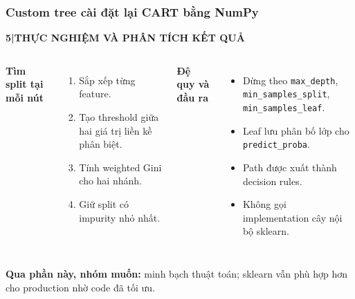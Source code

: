 \documentclass[aspectratio=169,12pt]{beamer}
\newcommand{\chaptertag}[2]{%
  \vspace{-0.16cm}%
  {\scriptsize\bfseries\textcolor{boxframe}{#1\enspace |\enspace #2}}\par
  \vspace{0.12cm}%
}
\begin{document}
\begin{frame}
  \frametitle{Custom tree cài đặt lại CART bằng NumPy}
  \chaptertag{5}{THỰC NGHIỆM VÀ PHÂN TÍCH KẾT QUẢ}
  \footnotesize
  \begin{columns}[T,onlytextwidth]
      \textbf{Tìm split tại mỗi nút}
      \begin{enumerate}
        \item Sắp xếp từng feature.
        \item Tạo threshold giữa hai giá trị liền kề phân biệt.
        \item Tính weighted Gini cho hai nhánh.
        \item Giữ split có impurity nhỏ nhất.
      \end{enumerate}
      \textbf{Đệ quy và đầu ra}
      \begin{itemize}
        \item Dừng theo \texttt{max\_depth}, \texttt{min\_samples\_split}, \texttt{min\_samples\_leaf}.
        \item Leaf lưu phân bố lớp cho \texttt{predict\_proba}.
        \item Path được xuất thành decision rules.
        \item Không gọi implementation cây nội bộ sklearn.
      \end{itemize}
  \end{columns}
  \vspace{0.15cm}
  \centering
  \textbf{Qua phần này, nhóm muốn:} minh bạch thuật toán; sklearn vẫn phù hợp hơn cho production nhờ code đã tối ưu.
\end{frame}
\end{document}
